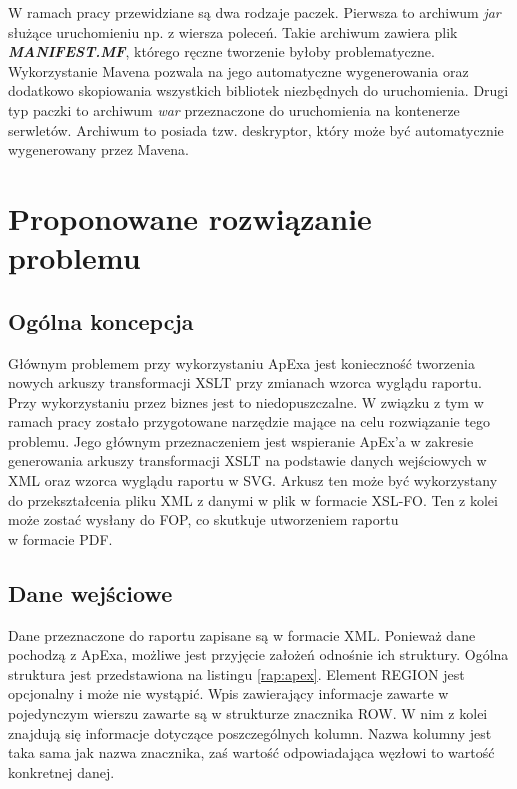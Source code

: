 \documentclass[11pt,a4paper]{article}
\begin{document}
W ramach pracy przewidziane są dwa rodzaje paczek. Pierwsza to archiwum \emph{jar} służące uruchomieniu np. z wiersza poleceń. Takie archiwum zawiera plik \textbf{\emph{MANIFEST.MF}}, którego ręczne tworzenie byłoby problematyczne. Wykorzystanie Mavena pozwala na jego automatyczne wygenerowania oraz dodatkowo skopiowania wszystkich bibliotek niezbędnych do uruchomienia. Drugi typ paczki to archiwum \emph{war} przeznaczone do uruchomienia na kontenerze serwletów. Archiwum to posiada tzw. deskryptor, który może być automatycznie wygenerowany przez Mavena.

\newpage


\section{Proponowane rozwiązanie problemu} \label{sec:solution}
\subsection{Ogólna koncepcja} \label{solution:koncept}
Głównym problemem przy wykorzystaniu ApExa jest konieczność tworzenia nowych arkuszy transformacji XSLT przy zmianach wzorca wyglądu raportu. Przy wykorzystaniu przez biznes jest to niedopuszczalne. W związku z tym w ramach pracy zostało przygotowane narzędzie mające na celu rozwiązanie tego problemu. Jego głównym przeznaczeniem jest wspieranie ApEx'a w zakresie generowania arkuszy transformacji XSLT na podstawie danych wejściowych w XML oraz wzorca wyglądu raportu w SVG. Arkusz ten może być wykorzystany do przekształcenia pliku XML z danymi w plik w formacie XSL-FO. Ten z kolei może zostać wysłany do FOP, co skutkuje utworzeniem raportu\\w formacie PDF.

\subsection{Dane wejściowe} \label{solution:data}
Dane przeznaczone do raportu zapisane są w formacie XML. Ponieważ dane pochodzą z ApExa, możliwe jest przyjęcie założeń odnośnie ich struktury. Ogólna struktura jest przedstawiona na listingu \ref{rap:apex}. Element REGION jest opcjonalny i może nie wystąpić. Wpis zawierający informacje zawarte w pojedynczym wierszu zawarte są w strukturze znacznika ROW. W nim z kolei znajdują się informacje dotyczące poszczególnych kolumn. Nazwa kolumny jest taka sama jak nazwa znacznika, zaś wartość odpowiadająca węzłowi to wartość konkretnej danej.
\end{document}
